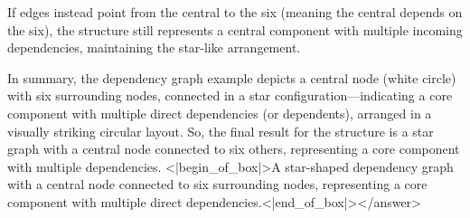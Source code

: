 If edges instead point from the central to the six (meaning the central depends on the six), the structure still represents a central component with multiple incoming dependencies, maintaining the star-like arrangement.  

In summary, the dependency graph example depicts a central node (white circle) with six surrounding nodes, connected in a star configuration—indicating a core component with multiple direct dependencies (or dependents), arranged in a visually striking circular layout.  
So, the final result for the structure is a star graph with a central node connected to six others, representing a core component with multiple dependencies.  
<|begin_of_box|>A star-shaped dependency graph with a central node connected to six surrounding nodes, representing a core component with multiple direct dependencies.<|end_of_box|></answer>